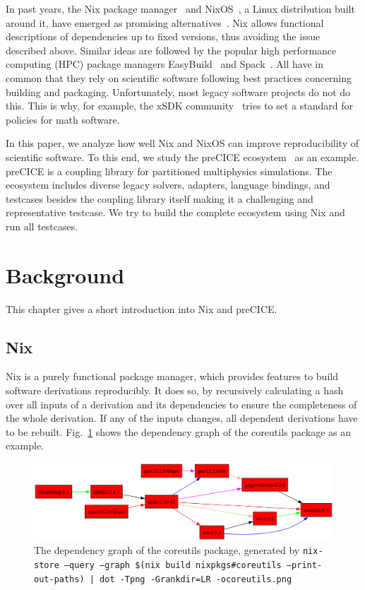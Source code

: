 \documentclass{eceasst}
\begin{document}
In past years, the Nix package manager~\cite{Dolstra_2004} and NixOS~\cite{Dolstra_2010}, a Linux distribution built around it, have emerged as promising alternatives~\cite{Devresse_2015}.
Nix allows functional descriptions of dependencies up to fixed versions, thus avoiding the issue described above.
Similar ideas are followed by the popular high performance computing (HPC) package managers EasyBuild~\cite{easybuil6495863} and Spack~\cite{spack7832814}.
All have in common that they rely on scientific software following best practices concerning building and packaging.
Unfortunately, most legacy software projects do not do this.
This is why, for example, the xSDK community~\cite{xSDK2023} tries to set a standard for policies for math software.

In this paper, we analyze how well Nix and NixOS can improve reproducibility of scientific software.
To this end, we study the preCICE ecosystem~\cite{preCICEv2} as an example.
preCICE is a coupling library for partitioned multiphysics simulations.
The ecosystem includes diverse legacy solvers, adapters, language bindings, and testcases besides the coupling library itself making it a challenging and representative testcase.
We try to build the complete ecosystem using Nix and run all testcases.

\section{Background}

This chapter gives a short introduction into Nix and preCICE.

\subsection{Nix}\label{sec:nix}

Nix is a purely functional package manager, which provides features to build software derivations reproducibly.
It does so, by recursively calculating a hash over all inputs of a derivation and its dependencies to ensure the completeness of the whole derivation.
If any of the inputs changes, all dependent derivations have to be rebuilt.
Fig.~\ref{fig:nix-graph} shows the dependency graph of the coreutils package as an example.

\begin{figure}
    \centering
    \includegraphics[width=1\textwidth]{figures/coreutils.png}
    \caption{The dependency graph of the coreutils package, generated by \texttt{nix-store --query --graph \$(nix build nixpkgs\#coreutils --print-out-paths) | dot -Tpng -Grankdir=LR -ocoreutils.png}}
    \label{fig:nix-graph}
\end{figure}
\end{document}
